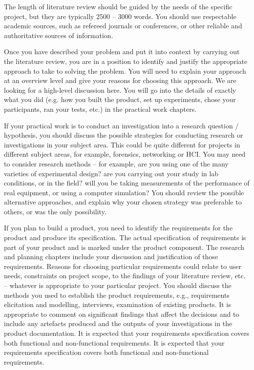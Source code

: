 {    The length of literature review should be guided by the needs of the specific project, but they are typically 2500 – 3000 words. You should use respectable academic sources,
    such as refereed journals or conferences, or other reliable and authoritative sources of information.

    Once you have described your problem and put it into context by carrying out the literature review, you are in a position to identify and justify the appropriate approach
    to take to solving the problem. You will need to explain your approach at an overview level and give your reasons for choosing this approach. We are looking for a
    high-level discussion here. You will go into the details of exactly what you did (e.g. how you built the product, set up experiments, chose your participants, ran your
    tests, etc.) in the practical work chapters.

    If your practical work is to conduct an investigation into a research question / hypothesis, you should discuss the possible strategies for conducting research or
    investigations in your subject area. This could be quite different for projects in different subject areas, for example, forensics, networking or HCI. You may need to
    consider research methods – for example, are you using one of the many varieties of experimental design? are you carrying out your study in lab conditions, or in the
    field? will you be taking measurements of the performance of real equipment, or using a computer simulation? You should review the possible alternative approaches, and
    explain why your chosen strategy was preferable to others, or was the only possibility.

    If you plan to build a product, you need to identify the requirements for the product and produce its specification. The actual specification of requirements is part
    of your product and is marked under the product component. The research and planning chapters include your discussion and justification of those requirements. Reasons
    for choosing particular requirements could relate to user needs, constraints on project scope, to the findings of your literature review, etc. – whatever is appropriate
    to your particular project. You should discuss the methods you used to establish the product requirements, e.g., requirements elicitation and modelling, interviews,
    examination of existing products. It is appropriate to comment on significant findings that affect the decisions and to include any artefacts produced and the outputs
    of your investigations in the product documentation. It is expected that your requirements specification covers both functional and non-functional requirements. It is
    expected that your requirements specification covers both functional and non-functional requirements.

}
